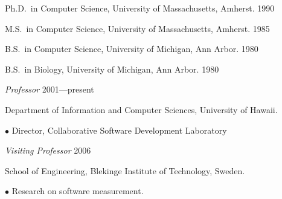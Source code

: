 \begin{Degrees} 
\item Ph.D.~in Computer Science, University of Massachusetts, Amherst. 1990
\item M.S.~in Computer Science, University of Massachusetts, Amherst. 1985 
\item B.S.~in Computer Science,  University of Michigan, Ann Arbor. 1980 
\item B.S.~in Biology, University of Michigan, Ann Arbor. 1980  
\end{Degrees}

\begin{Research and Teaching Experience}
  
\item {\em Professor} \hfill 2001---present 
\vspace*{-10pt}
\item Department of Information and Computer Sciences, University of Hawaii.  
  
 $\bullet$  Director, Collaborative Software Development Laboratory \newline


\item {\em Visiting Professor} \hfill   2006
\vspace*{-10pt}
\item School of Engineering, Blekinge Institute of Technology, Sweden.

 $\bullet$  Research on software measurement. \newline


\end{Research and Teaching Experience}

